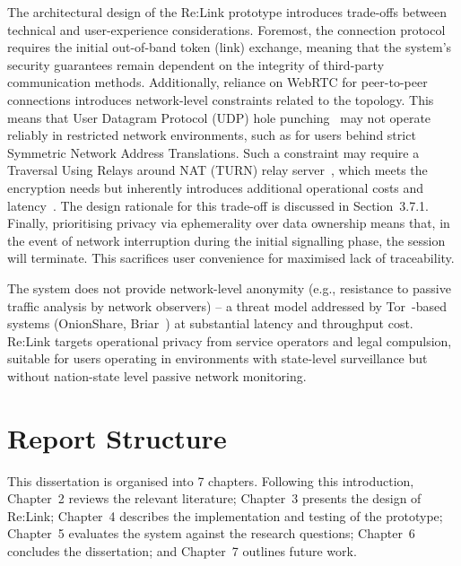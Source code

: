 \documentclass[12pt,a4paper,oneside]{report}
\begin{document}
The architectural design of the Re:Link prototype introduces trade-offs between technical and user-experience considerations. Foremost, the connection protocol requires the initial out-of-band token (link) exchange, meaning that the system's security guarantees remain dependent on the integrity of third-party communication methods. Additionally, reliance on WebRTC for peer-to-peer connections introduces network-level constraints related to the topology. This means that User Datagram Protocol (UDP) hole punching~\cite{rfc5128} may not operate reliably in restricted network environments, such as for users behind strict Symmetric Network Address Translations. Such a constraint may require a Traversal Using Relays around NAT (TURN) relay server~\cite{rfc8656}, which meets the encryption needs but inherently introduces additional operational costs and latency~\cite{geantstun,rfc5389,ploswebrtc}. The design rationale for this trade-off is discussed in Section~3.7.1. Finally, prioritising privacy via ephemerality over data ownership means that, in the event of network interruption during the initial signalling phase, the session will terminate. This sacrifices user convenience for maximised lack of traceability.

The system does not provide network-level anonymity (e.g., resistance to passive traffic analysis by network observers) -- a threat model addressed by Tor~\cite{tor}-based systems (OnionShare, Briar~\cite{briar}) at substantial latency and throughput cost. Re:Link targets operational privacy from service operators and legal compulsion, suitable for users operating in environments with state-level surveillance but without nation-state level passive network monitoring.


\section{Report Structure}
\label{sec:report-structure}

This dissertation is organised into 7 chapters. Following this introduction, Chapter~2 reviews the relevant literature; Chapter~3 presents the design of Re:Link; Chapter~4 describes the implementation and testing of the prototype; Chapter~5 evaluates the system against the research questions; Chapter~6 concludes the dissertation; and Chapter~7 outlines future work.


\end{document}
